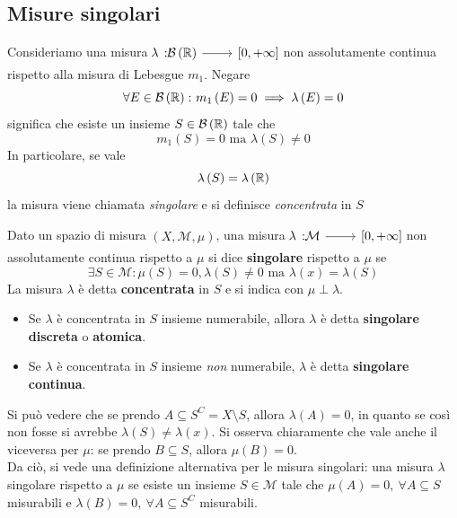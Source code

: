 \subsection{Misure singolari}
Consideriamo una misura $\funz{\lambda}{\mathcal{B}\left(\realset\right)}{\left[0,+\infty\right]}$ non assolutamente continua rispetto alla misura di Lebesgue $m_1$.
Negare
\begin{equation*}
	\forall E\in\mathcal{B}\left(\mathbb{R}\right)\colon m_1\left(E\right)=0\implies \lambda\left(E\right)=0
\end{equation*}
significa che esiste un insieme $S\in\mathcal{B}\left(\mathbb{R}\right)$ tale che
\begin{equation*}
	m_1\left(S\right)=0\text{ ma }\lambda\left(S\right)\neq 0
\end{equation*}
In particolare, se vale
\begin{equation*}
	\lambda\left(S\right)=\lambda\left(\mathbb{R}\right)
\end{equation*}
la misura viene chiamata \textit{singolare} e si definisce \textit{concentrata} in $S$
\begin{define}
	Dato un spazio di misura $\left(X,\mathcal{M},\mu\right)$, una misura $\funz{\lambda}{\mathcal{M}}{\left[0,+\infty\right]}$ non assolutamente continua rispetto a $\mu$ si dice \textbf{singolare} rispetto a $\mu$ se
	\begin{equation}
		\exists S\in\mathcal{M}\colon \mu\left(S\right)=0, \lambda\left(S\right)\neq0 \text{ ma }\lambda(x)=\lambda\left(S\right)
	\end{equation}
	La misura $\lambda$ è detta \textbf{concentrata} in $S$ e si indica con $\mu\perp\lambda$.
	\begin{itemize}
		\item Se $\lambda$ è concentrata in $S$ insieme numerabile, allora $\lambda$ è detta \textbf{singolare discreta} o \textbf{atomica}.
		\item Se $\lambda$ è concentrata in $S$ insieme \textit{non} numerabile, $\lambda$ è detta \textbf{singolare continua}.
	\end{itemize}
\end{define}
\begin{observe}
	Si può vedere che se prendo $A\subseteq S^{C}=X\setminus S$, allora $\lambda\left(A\right)=0$, in quanto se così non fosse si avrebbe $\lambda\left(S\right)\neq\lambda(x)$. Si osserva chiaramente che vale anche il viceversa per $\mu$: se prendo $B\subseteq S$, allora $\mu\left(B\right)=0$.\\
	Da ciò, si vede una definizione alternativa per le misura singolari: una misura $\lambda$ singolare rispetto a $\mu$ se esiste un insieme $S\in\mathcal{M}$ tale che $\mu\left(A\right)=0,\ \forall A\subseteq S$ misurabili e $\lambda\left(B\right)=0,\ \forall A\subseteq S^{C}$ misurabili.
\end{observe}
